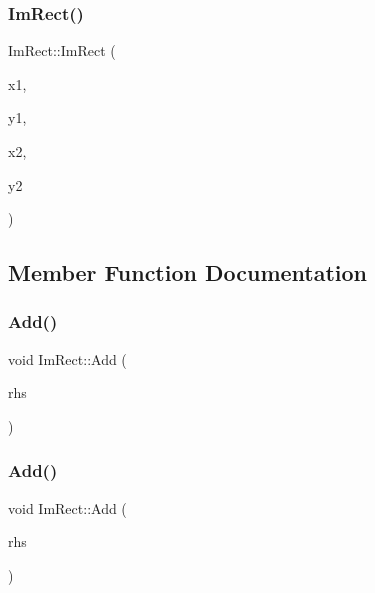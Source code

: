 \hypertarget{struct_im_rect_a4cd168f1ae088e15db64b95b880f8933}{}\label{struct_im_rect_a4cd168f1ae088e15db64b95b880f8933} 
\subsubsection{\texorpdfstring{Im\+Rect()}{ImRect()}\hspace{0.1cm}{\footnotesize\ttfamily [4/4]}}
{\footnotesize\ttfamily Im\+Rect\+::\+Im\+Rect (\begin{DoxyParamCaption}\item[{float}]{x1,  }\item[{float}]{y1,  }\item[{float}]{x2,  }\item[{float}]{y2 }\end{DoxyParamCaption})}



\subsection{Member Function Documentation}
\hypertarget{struct_im_rect_a9d6cbef8c86ca01a16bb0fd35b457f88}{}\label{struct_im_rect_a9d6cbef8c86ca01a16bb0fd35b457f88} 
\subsubsection{\texorpdfstring{Add()}{Add()}\hspace{0.1cm}{\footnotesize\ttfamily [1/2]}}
{\footnotesize\ttfamily void Im\+Rect\+::\+Add (\begin{DoxyParamCaption}\item[{const \hyperlink{struct_im_vec2}{Im\+Vec2} \&}]{rhs }\end{DoxyParamCaption})}

\hypertarget{struct_im_rect_a9bcb65fd17843c74555291a522e9ebdf}{}\label{struct_im_rect_a9bcb65fd17843c74555291a522e9ebdf} 
\subsubsection{\texorpdfstring{Add()}{Add()}\hspace{0.1cm}{\footnotesize\ttfamily [2/2]}}
{\footnotesize\ttfamily void Im\+Rect\+::\+Add (\begin{DoxyParamCaption}\item[{const \hyperlink{struct_im_rect}{Im\+Rect} \&}]{rhs }\end{DoxyParamCaption})}

